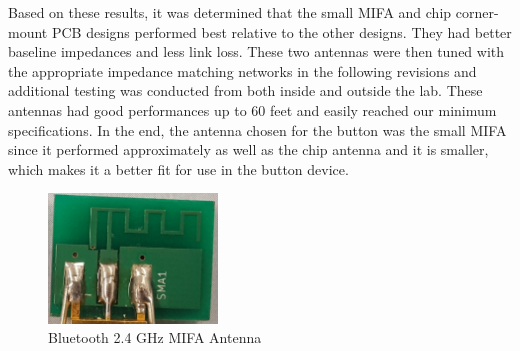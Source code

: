 \documentclass[journal,compsoc]{IEEEtran}
\begin{document}
Based on these results, it was determined that the small MIFA and chip corner-mount PCB designs performed best relative to the other designs.  They had better baseline impedances and less link loss.  These two antennas were then tuned with the appropriate impedance matching networks in the following revisions and additional testing was conducted from both inside and outside the lab.  These antennas had good performances up to 60 feet and easily reached our minimum specifications.  In the end, the antenna chosen for the button was the small MIFA since it performed approximately as well as the chip antenna and it is smaller, which makes it a better fit for use in the button device.

\begin{figure}[ht]	%
\centering
\includegraphics[width=0.4\textwidth]{2_4GHzSMIFAAntenna.jpg}
\caption{Bluetooth 2.4 GHz MIFA Antenna}
\label{2.4 Small MIFA}
\end{figure}
\end{document}
